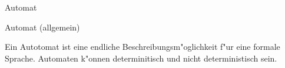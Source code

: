 \documentclass[class=article, crop=false]{standalone}
\begin{document}
\begin{zettel}{Automat}
\begin{flashcard}[wrvlnkgs]{Automat (allgemein)}
	\begin{definition}
		Ein Autotomat ist eine endliche Beschreibungsm"oglichkeit f"ur eine formale Sprache.
		Automaten k"onnen determinitisch und nicht deterministisch sein.
	\end{definition}
\end{flashcard}
\end{zettel}
\end{document}
